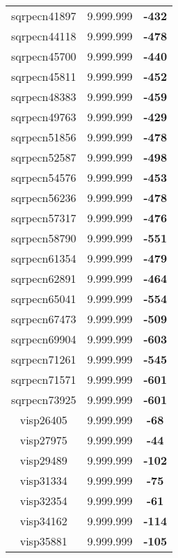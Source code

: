 \begin{tabular}{cc||c}
sqrpecn41897     & 9.999.999        & {\bf -432}      \\ 
sqrpecn44118     & 9.999.999        & {\bf -478}      \\ 
sqrpecn45700     & 9.999.999        & {\bf -440}      \\ 
sqrpecn45811     & 9.999.999        & {\bf -452}      \\ 
sqrpecn48383     & 9.999.999        & {\bf -459}      \\ 
sqrpecn49763     & 9.999.999        & {\bf -429}      \\ 
sqrpecn51856     & 9.999.999        & {\bf -478}      \\ 
sqrpecn52587     & 9.999.999        & {\bf -498}      \\ 
sqrpecn54576     & 9.999.999        & {\bf -453}      \\ 
sqrpecn56236     & 9.999.999        & {\bf -478}      \\ 
sqrpecn57317     & 9.999.999        & {\bf -476}      \\ 
sqrpecn58790     & 9.999.999        & {\bf -551}      \\ 
sqrpecn61354     & 9.999.999        & {\bf -479}      \\ 
sqrpecn62891     & 9.999.999        & {\bf -464}      \\ 
sqrpecn65041     & 9.999.999        & {\bf -554}      \\ 
sqrpecn67473     & 9.999.999        & {\bf -509}      \\ 
sqrpecn69904     & 9.999.999        & {\bf -603}      \\ 
sqrpecn71261     & 9.999.999        & {\bf -545}      \\ 
sqrpecn71571     & 9.999.999        & {\bf -601}      \\ 
sqrpecn73925     & 9.999.999        & {\bf -601}      \\ 
visp26405        & 9.999.999        & {\bf -68}       \\ 
visp27975        & 9.999.999        & {\bf -44}       \\ 
visp29489        & 9.999.999        & {\bf -102}      \\ 
visp31334        & 9.999.999        & {\bf -75}       \\ 
visp32354        & 9.999.999        & {\bf -61}       \\ 
visp34162        & 9.999.999        & {\bf -114}      \\ 
visp35881        & 9.999.999        & {\bf -105}      \\ 

\end{tabular}

